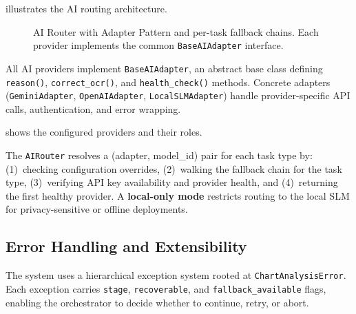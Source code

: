  illustrates the AI routing architecture.

\begin{figure}[htbp]
\centering

\caption{AI Router with Adapter Pattern and per-task fallback chains.
    Each provider implements the common \texttt{BaseAIAdapter} interface.}
\label{fig:ai_router}
\end{figure}

All AI providers implement \texttt{BaseAIAdapter}, an abstract base class defining
\texttt{reason()}, \texttt{correct\_ocr()}, and \texttt{health\_check()} methods.
Concrete adapters (\texttt{GeminiAdapter}, \texttt{OpenAIAdapter},
\texttt{LocalSLMAdapter}) handle provider-specific API calls, authentication, and
error wrapping.

 shows the configured providers and their roles.

\begin{table}[htbp]
\centering
\caption{AI provider configuration.}
\label{tab:ai_providers}

\end{table}

The \texttt{AIRouter} resolves a (adapter, model\_id) pair for each task type by:
(1)~checking configuration overrides, (2)~walking the fallback chain for the task type,
(3)~verifying API key availability and provider health, and (4)~returning the first
healthy provider. A \textbf{local-only mode} restricts routing to the local SLM for
privacy-sensitive or offline deployments.

\subsection{Error Handling and Extensibility}

The system uses a hierarchical exception system rooted at \texttt{ChartAnalysisError}.
Each exception carries \texttt{stage}, \texttt{recoverable}, and
\texttt{fallback\_available} flags, enabling the orchestrator to decide whether to
continue, retry, or abort.

